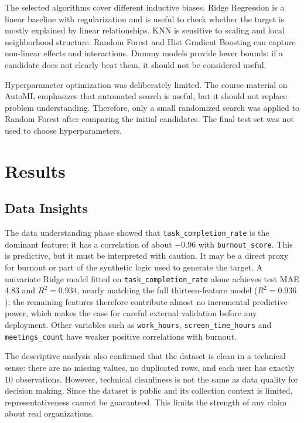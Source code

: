 \documentclass[conference]{IEEEtran}
\begin{document}
The selected algorithms cover different inductive biases. Ridge Regression is a
linear baseline with regularization and is useful to check whether the target is
mostly explained by linear relationships. KNN is sensitive to scaling and local
neighborhood structure. Random Forest and Hist Gradient Boosting can capture
non-linear effects and interactions. Dummy models provide lower bounds: if a
candidate does not clearly beat them, it should not be considered useful.

Hyperparameter optimization was deliberately limited. The course material on
AutoML emphasizes that automated search is useful, but it should not replace
problem understanding. Therefore, only a small randomized search was applied to
Random Forest after comparing the initial candidates. The final test set was not
used to choose hyperparameters.

\section{Results}

\subsection{Data Insights}

The data understanding phase showed that \texttt{task\_completion\_rate} is the
dominant feature: it has a correlation of about $-0.96$ with
\texttt{burnout\_score}. This is predictive, but it must be interpreted with
caution. It may be a direct proxy for burnout or part of the synthetic logic used
to generate the target. A univariate Ridge model fitted on
\texttt{task\_completion\_rate} alone achieves test MAE 4.83 and $R^2=0.934$,
nearly matching the full thirteen-feature model ($R^2=0.936$); the remaining
features therefore contribute almost no incremental predictive power, which
makes the case for careful external validation before any deployment.
Other variables such as \texttt{work\_hours},
\texttt{screen\_time\_hours} and \texttt{meetings\_count} have weaker positive
correlations with burnout.

The descriptive analysis also confirmed that the dataset is clean in a
technical sense: there are no missing values, no duplicated rows, and each user
has exactly 10 observations. However, technical cleanliness is not the same as
data quality for decision making. Since the dataset is public and its collection
context is limited, representativeness cannot be guaranteed. This limits the
strength of any claim about real organizations.
\end{document}
